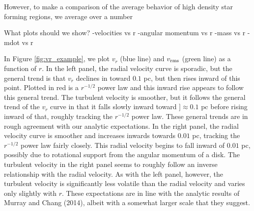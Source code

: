 \documentclass{emulateapj}
\begin{document}


However, to make a comparison of the average behavior of high density star forming regions, we average over a number 

What plots should we show?
-velocities vs r
-angular momentum vs r
-mass vs r
-mdot vs r

In Figure \ref{fig:vr_example}, we plot $v_r$ (blue line) and $v_{\rm rms}$ (green line) as a function of $r$.  In the left panel, the radial velocity curve is sporadic, but the general trend is that $v_r$ declines in toward $0.1$ pc, but then rises inward of this point.  Plotted in red is a $r^{-1/2}$ power law and this inward rise appears to follow this general trend.  The turbulent velocity is smoother, but it follows the general trend of the $v_r$ curve in that it falls slowly inward toward $]\approx 0.1 $ pc before rising inward of that, roughly tracking the $r^{-1/2}$ power law.  These general trends are in rough agreement with our analytic expectations.  In the right panel, the radial velocity curve is smoother and increases inwards towards $0.01$ pc, tracking the $r^{-1/2}$ power law fairly closely.  This radial velocity begins to fall inward of $0.01$ pc, possibly due to rotational support from the angular momentum of a disk.  The turbulent velocity in the right panel seems to roughly follow an inverse relationship with the radial velocity.  As with the left panel, however, the turbulent velocity is significantly less volatile than the radial velocity and varies only slightly with $r$.   These expectations are in line with the analytic results of Murray and Chang (2014), albeit with a somewhat larger scale that they suggest.  
 
\end{document}

